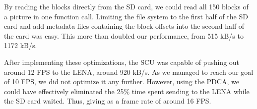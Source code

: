 \begin{description}
		By reading the blocks directly from the SD card, we could read
		all 150 blocks of a picture in one function call. Limiting the
		file system to the first half of the SD card and add metadata
		files containing the block offsets into the second half of the
		card was easy. This more than doubled our performance, from 515
		kB/s to 1172 kB/s.
\end{description}

After implementing these optimizations, the \ac{SCU} was capable of pushing out around
12 FPS to the \ac{LENA}, around 920 kB/s. As we managed to reach our goal of 10
FPS, we did not optimize it any further. However, using the \ac{PDCA}, we could
have effectively eliminated the 25\% time spent sending to the \ac{LENA} while
the \ac{SD} card waited. Thus, giving as a frame rate of around 16
FPS. 


